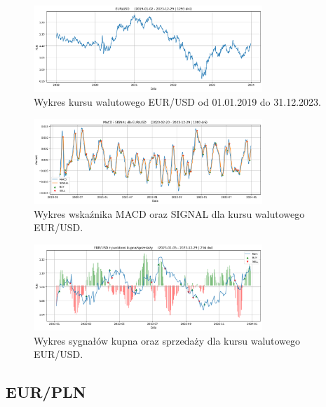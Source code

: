 \documentclass[12pt, a4paper]{article}
\begin{document}
\begin{figure}[ht]
    \centering
    \includegraphics[width=0.77\textwidth]{eur_usd_value.png}
    \caption{Wykres kursu walutowego EUR/USD od 01.01.2019 do 31.12.2023.}
    \label{fig:all:eur_usd_value}
\end{figure}
\begin{figure}[ht]
    \centering
    \includegraphics[width=0.77\textwidth]{eur_usd_macd_signal.png}
    \caption{Wykres wskaźnika MACD oraz SIGNAL dla kursu walutowego EUR/USD.}
    \label{fig:all:eur_usd_macd_signal}
\end{figure}
\begin{figure}[ht]
    \centering
    \includegraphics[width=0.77\textwidth]{eur_usd_value_buy_sell.png}
    \caption{Wykres sygnałów kupna oraz sprzedaży dla kursu walutowego EUR/USD.}
    \label{fig:all:eur_usd_value_buy_sell}
\end{figure}

\pagebreak







\subsection{EUR/PLN}
\end{document}
